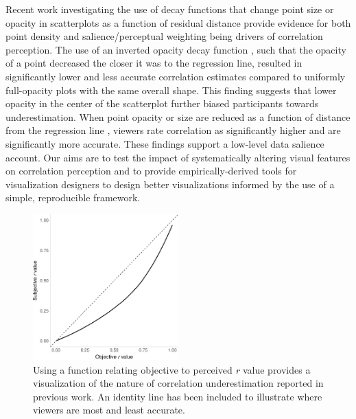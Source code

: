 \documentclass[manuscript, review, anonymous, screen]{acmart}
\begin{document}
Recent work investigating the use of decay functions that change point
size or opacity in scatterplots as a function of residual distance
provide evidence for both point density and salience/perceptual
weighting being drivers of correlation perception. The use of an
inverted opacity decay function \citep{strain_2023}, such that the
opacity of a point decreased the closer it was to the regression line,
resulted in significantly lower and less accurate correlation estimates
compared to uniformly full-opacity plots with the same overall shape.
This finding suggests that lower opacity in the center of the
scatterplot further biased participants towards underestimation. When
point opacity or size are reduced as a function of distance from the
regression line \citep{strain_2023, strain_2023b}, viewers rate
correlation as significantly higher and are significantly more accurate.
These findings support a low-level data salience account. Our aims are
to test the impact of systematically altering visual features on
correlation perception and to provide empirically-derived tools for
visualization designers to design better visualizations informed by the
use of a simple, reproducible framework.

\begin{figure}

\includegraphics[width=0.5\textwidth,height=\textheight]{size_and_opacity_files/figure-pdf/fig-underestimation-curve-1.pdf} \hfill{}

\caption{\label{fig-underestimation-curve}Using a function relating
objective to perceived \emph{r} value \citep{rensink_2017} provides a
visualization of the nature of correlation underestimation reported in
previous work. An identity line has been included to illustrate where
viewers are most and least accurate.}

\end{figure}
\end{document}

